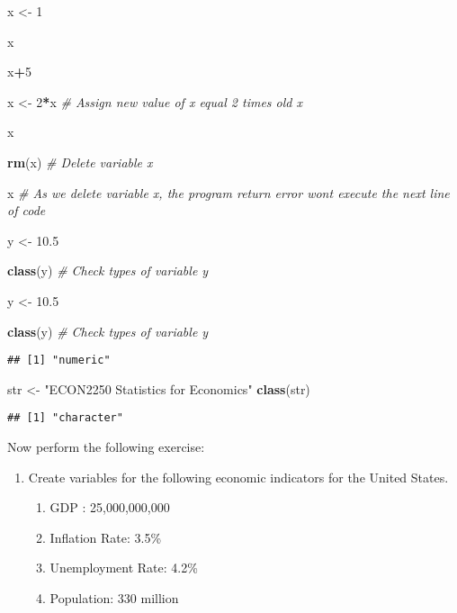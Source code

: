 \documentclass[
]{article}
\newenvironment{Shaded}{\begin{snugshade}}{\end{snugshade}}
\newcommand{\CommentTok}[1]{\textcolor[rgb]{0.56,0.35,0.01}{\textit{#1}}}
\newcommand{\DecValTok}[1]{\textcolor[rgb]{0.00,0.00,0.81}{#1}}
\newcommand{\FloatTok}[1]{\textcolor[rgb]{0.00,0.00,0.81}{#1}}
\newcommand{\FunctionTok}[1]{\textcolor[rgb]{0.13,0.29,0.53}{\textbf{#1}}}
\newcommand{\NormalTok}[1]{#1}
\newcommand{\OtherTok}[1]{\textcolor[rgb]{0.56,0.35,0.01}{#1}}
\newcommand{\SpecialCharTok}[1]{\textcolor[rgb]{0.81,0.36,0.00}{\textbf{#1}}}
\newcommand{\StringTok}[1]{\textcolor[rgb]{0.31,0.60,0.02}{#1}}
\providecommand{\tightlist}{%
  \setlength{\itemsep}{0pt}\setlength{\parskip}{0pt}}
\begin{document}
\begin{Shaded}
\begin{Highlighting}[]
\NormalTok{x }\OtherTok{\textless{}{-}} \DecValTok{1}

\NormalTok{x}

\NormalTok{x}\SpecialCharTok{+}\DecValTok{5}

\NormalTok{x }\OtherTok{\textless{}{-}} \DecValTok{2}\SpecialCharTok{*}\NormalTok{x }\CommentTok{\# Assign new value of x equal 2 times old x}

\NormalTok{x}

\FunctionTok{rm}\NormalTok{(x) }\CommentTok{\# Delete variable x}

\NormalTok{x }\CommentTok{\# As we delete variable x, the program return error won\textquotesingle{}t execute the next line of code}

\NormalTok{y }\OtherTok{\textless{}{-}} \FloatTok{10.5}

\FunctionTok{class}\NormalTok{(y) }\CommentTok{\# Check types of variable y}
\end{Highlighting}
\end{Shaded}

\begin{Shaded}
\begin{Highlighting}[]
\NormalTok{y }\OtherTok{\textless{}{-}} \FloatTok{10.5}

\FunctionTok{class}\NormalTok{(y) }\CommentTok{\# Check types of variable y}
\end{Highlighting}
\end{Shaded}

\begin{verbatim}
## [1] "numeric"
\end{verbatim}

\begin{Shaded}
\begin{Highlighting}[]
\NormalTok{str }\OtherTok{\textless{}{-}} \StringTok{"ECON2250 Statistics for Economics"}
\FunctionTok{class}\NormalTok{(str)}
\end{Highlighting}
\end{Shaded}

\begin{verbatim}
## [1] "character"
\end{verbatim}

Now perform the following exercise:

\begin{enumerate}
\def\labelenumi{\arabic{enumi}.}
\tightlist
\item
  Create variables for the following economic indicators for the United
  States.

  \begin{enumerate}
  \def\labelenumii{\alph{enumii}.}
  \tightlist
  \item
    GDP : 25,000,000,000
  \item
    Inflation Rate: 3.5\%
  \item
    Unemployment Rate: 4.2\%
  \item
    Population: 330 million
  \end{enumerate}
\end{enumerate}
\end{document}
